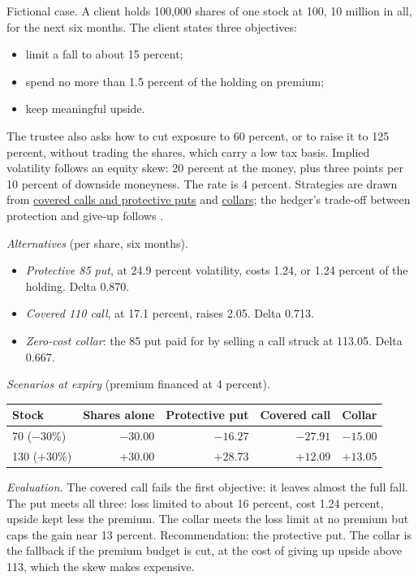 \begin{qfexample}\label{ex:option-strategy-selection-case}
 Fictional case. A client holds 100{,}000 shares of one stock at 100, 10 million in all, for the next six months. The client states three objectives:
\begin{itemize}
\item limit a fall to about 15 percent;
\item spend no more than 1.5 percent of the holding on premium;
\item keep meaningful upside.
\end{itemize}
The trustee also asks how to cut exposure to 60 percent, or to raise it to 125 percent, without trading the shares, which carry a low tax basis. Implied volatility follows an equity skew: 20 percent at the money, plus three points per 10 percent of downside moneyness. The rate is 4 percent. Strategies are drawn from \hyperref[meth:covered-call-protective-put]{covered calls and protective puts} and \hyperref[meth:option-spreads-volatility-strategies]{collars}; the hedger's trade-off between protection and give-up follows \citep[chap.~17, pp.~323--332]{s7-natenberg}.

 \emph{Alternatives} (per share, six months).
\begin{itemize}
\item \emph{Protective 85 put}, at 24.9 percent volatility, costs 1.24, or 1.24 percent of the holding. Delta 0.870.
\item \emph{Covered 110 call}, at 17.1 percent, raises 2.05. Delta 0.713.
\item \emph{Zero-cost collar}: the 85 put paid for by selling a call struck at 113.05. Delta 0.667.
\end{itemize}

\emph{Scenarios at expiry} (premium financed at 4 percent).
\begin{center}\small
\begin{tabular}{@{}lrrrr@{}}
\toprule
Stock & Shares alone & Protective put & Covered call & Collar \\
\midrule
70 ($-30\%$) & $-30.00$ & $-16.27$ & $-27.91$ & $-15.00$ \\
130 ($+30\%$) & $+30.00$ & $+28.73$ & $+12.09$ & $+13.05$ \\
\bottomrule
\end{tabular}
\end{center}
\emph{Evaluation.} The covered call fails the first objective: it leaves almost the full fall. The put meets all three: loss limited to about 16 percent, cost 1.24 percent, upside kept less the premium. The collar meets the loss limit at no premium but caps the gain near 13 percent. Recommendation: the protective put. The collar is the fallback if the premium budget is cut, at the cost of giving up upside above 113, which the skew makes expensive.


\end{qfexample}
